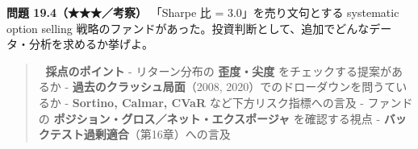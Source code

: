 \documentclass[11pt,a4paper]{report}
\begin{document}
\textbf{問題 19.4（★★★／考察）} 「Sharpe 比 = 3.0」を売り文句とする systematic option selling 戦略のファンドがあった。投資判断として、追加でどんなデータ・分析を求めるか挙げよ。

\begin{quote}
📝 \textbf{採点のポイント}
- リターン分布の \textbf{歪度・尖度} をチェックする提案があるか
- \textbf{過去のクラッシュ局面}（2008, 2020）でのドローダウンを問うているか
- \textbf{Sortino, Calmar, CVaR} など下方リスク指標への言及
- ファンドの \textbf{ポジション・グロス／ネット・エクスポージャ} を確認する視点
- \textbf{バックテスト過剰適合}（第16章）への言及
\end{quote}

\noindent\hrulefill
\end{document}

